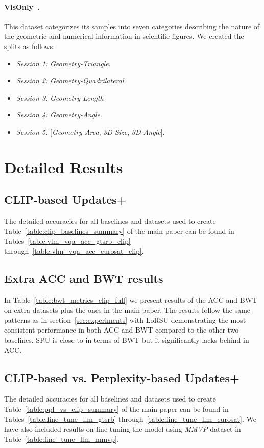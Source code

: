\paragraph{VisOnly~\cite{kamoi2024visonlyqa}.} This dataset categorizes its samples into seven categories describing the nature of the geometric and numerical information in scientific figures. We created the splits as follows:
\begin{itemize}
    \item \emph{Session 1:} \textit{Geometry-Triangle}.
    \item \emph{Session 2:} \textit{Geometry-Quadrilateral}.
    \item \emph{Session 3:} \textit{Geometry-Length}
    \item \emph{Session 4:} \textit{Geometry-Angle}.
    \item \emph{Session 5:} [\textit{Geometry-Area}, \textit{3D-Size}, \textit{3D-Angle}].
\end{itemize}



\section{Detailed Results}\label{sec_appx:detailed_res}

\subsection{CLIP-based Updates+}
The detailed accuracies for all baselines and datasets used to create Table~\ref{table:clip_baselines_summary} of the main paper can be found in Tables~\ref{table:vlm_vqa_acc_gtsrb_clip} through~\ref{table:vlm_vqa_acc_eurosat_clip}.


\subsection{Extra ACC and BWT results}\label{sec_appx:extra_bwt_results}

In Table~\ref{table:bwt_metrics_clip_full} we present results of the ACC and BWT on extra datasets plus the ones in the main paper. The results follow the same patterns as in section~\ref{sec:experiments} with LoRSU demonstrating the most consistent performance in both ACC and BWT compared to the other two baselines. SPU is close to \ours in terms of BWT but it significantly lacks behind in ACC.

\subsection{CLIP-based vs. Perplexity-based Updates+}
The detailed accuracies for all baselines and datasets used to create Table~\ref{table:ppl_vs_clip_summary} of the main paper can be found in Tables~\ref{table:fine_tune_llm_gtsrb} through~\ref{table:fine_tune_llm_eurosat}. We have also included results on fine-tuning the model using \emph{MMVP} dataset in Table~\ref{table:fine_tune_llm_mmvp}.



